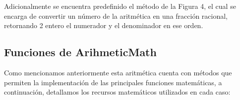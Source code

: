 \documentclass[a4paper,10pt,twocolumn]{article}
\begin{document}
Adicionalmente se encuentra predefinido el método de la Figura 4, el cual se encarga de convertir un número de la aritmética en una fracción racional, retornando 2 entero el numerador y el denominador en ese orden.

\subsection{Funciones de ArihmeticMath}\label{sub:functions}


Como mencionamos anteriormente esta aritmética cuenta con métodos que permiten la implementación de las principales funciones matemáticas, a continuación, detallamos los recursos matemáticos utilizados en cada caso:
\end{document}
